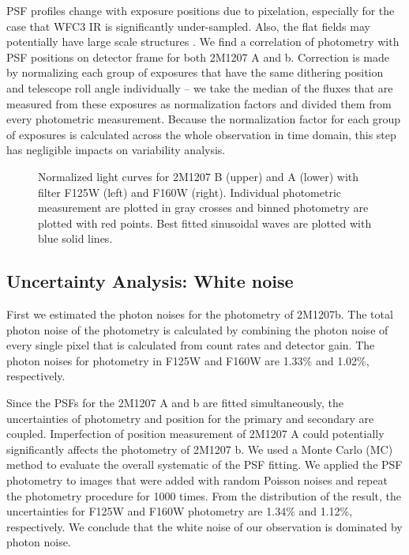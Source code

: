 \documentclass[apj]{emulateapj}
\begin{document}
PSF profiles change with exposure positions due to
pixelation, especially for the case that WFC3 IR is significantly
under-sampled. Also, the flat fields may potentially have large scale
structures \citep{dressel2012wide}. We find a correlation of
photometry with PSF positions on detector frame for both 2M1207 A and
b. Correction is made by normalizing each group of
exposures that have the same dithering position and telescope roll angle
individually -- we take the median of the fluxes that are measured
from these exposures as normalization factors and divided them from
every photometric measurement. Because the normalization factor for
each group of exposures is calculated across the whole observation in
time domain,
this step has negligible impacts on variability
analysis.

  \begin{figure}
  \centering
  \caption{Normalized light curves for 2M1207 B (upper) and A (lower)
    with filter F125W (left) and F160W (right). Individual photometric
  measurement are plotted in gray crosses and binned photometry are
  plotted with red points. Best fitted sinusoidal waves are plotted
  with blue solid lines.}
  \label{fig:3}
\end{figure}



\subsection{Uncertainty Analysis: White noise}

First we estimated the photon noises for the photometry of
2M1207b. The total photon noise of the photometry is calculated by
combining the photon noise of every single pixel that is calculated
from count rates and detector gain. The photon noises for photometry
in F125W and F160W are 1.33\% and 1.02\%, respectively.

Since the PSFs for the 2M1207 A and b are fitted simultaneously, the
uncertainties of photometry and position for the primary and secondary
are coupled. Imperfection of position measurement of 2M1207 A could
potentially significantly affects the photometry of 2M1207 b. We used a Monte Carlo
(MC) method to evaluate the overall systematic of the PSF fitting. We
applied the PSF photometry to images that were added with random
Poisson noises and repeat the photometry procedure for 1000
times. From the distribution of the result, the uncertainties for F125W
and F160W photometry are 1.34\% and 1.12\%, respectively. We conclude
that the white noise of our observation is dominated by photon noise.
\end{document}
